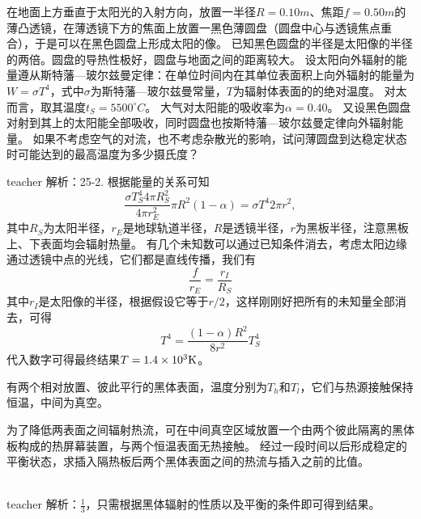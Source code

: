 \begin{example}
在地面上方垂直于太阳光的入射方向，放置一半径$R=0.10\unit{m}$、焦距$f=0.50\unit{m}$的薄凸透镜，在薄透镜下方的焦面上放置一黑色薄圆盘（圆盘中心与透镜焦点重合），于是可以在黑色圆盘上形成太阳的像。
已知黑色圆盘的半径是太阳像的半径的两倍。圆盘的导热性极好，圆盘与地面之间的距离较大。
设太阳向外辐射的能量遵从斯特藩—玻尔兹曼定律：在单位时间内在其单位表面积上向外辐射的能量为$W = \sigma T^4$，式中$\sigma$为斯特藩—玻尔兹曼常量，$T$为辐射体表面的的绝对温度。
对太而言，取其温度$t_S = 5500^\circ C$。
大气对太阳能的吸收率为$\alpha = 0.40$。
又设黑色圆盘对射到其上的太阳能全部吸收，同时圆盘也按斯特藩—玻尔兹曼定律向外辐射能量。
如果不考虑空气的对流，也不考虑杂散光的影响，试问薄圆盘到达稳定状态时可能达到的最高温度为多少摄氏度？

\begin{taggedblock}{teacher}
\noindent
解析：25-2. 根据能量的关系可知
\[
\frac{\sigma T_S^4 4\pi R_S^2}{4\pi r_E^2}\pi R^2(1-\alpha) = \sigma T^4 2 \pi r^2,
\]
其中$R_S$为太阳半径，$r_E$是地球轨道半径，$R$是透镜半径，$r$为黑板半径，注意黑板上、下表面均会辐射热量。
有几个未知数可以通过已知条件消去，考虑太阳边缘通过透镜中点的光线，它们都是直线传播，我们有
\[
\frac{f}{r_E} = \frac{r_I}{R_S}
\]
其中$r_I$是太阳像的半径，根据假设它等于$r/2$，这样刚刚好把所有的未知量全部消去，可得
\[
T^4 = \frac{(1-\alpha)R^2}{8r^2}T_S^4
\]
代入数字可得最终结果$T = 1.4\times 10^{3}{\rm{K}}$。
\end{taggedblock}
\end{example}

\begin{example}
有两个相对放置、彼此平行的黑体表面，温度分别为$T_h$和$T_l$，它们与热源接触保持恒温，中间为真空。

为了降低两表面之间辐射热流，可在中间真空区域放置一个由两个彼此隔离的黑体板构成的热屏幕装置，与两个恒温表面无热接触。
经过一段时间以后形成稳定的平衡状态，求插入隔热板后两个黑体表面之间的热流与插入之前的比值。
\\
\\
\begin{taggedblock}{teacher}
\noindent
解析：$\frac{1}{3}$，只需根据黑体辐射的性质以及平衡的条件即可得到结果。
\end{taggedblock}
\end{example}




















